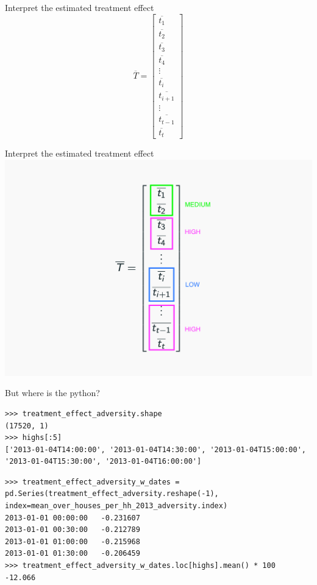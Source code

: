 \documentclass{beamer}
\begin{document}
\begin{frame}{Interpret the estimated treatment effect}
    $$
    \overline{T} = \left[\begin{array}{cccc}
    \overline{t_{1}} \\
    \overline{t_{2}} \\
    \overline{t_{3}} \\
    \overline{t_{4}} \\
    \vdots \\
    \overline{t_{i}} \\
    \overline{t_{i+1}} \\
    \vdots \\
    \overline{t_{t-1}} \\
    \overline{t_{t}}
    \end{array}\right]
    $$
\end{frame}

\begin{frame}{Interpret the estimated treatment effect}
  \centering
  \includegraphics[width=1\textwidth]{images/linear-treatment-hours.png}
\end{frame}

\begin{frame}{But where is the python?}
  \begin{verbatim}
>>> treatment_effect_adversity.shape
(17520, 1)
>>> highs[:5]
['2013-01-04T14:00:00', '2013-01-04T14:30:00', '2013-01-04T15:00:00', '2013-01-04T15:30:00', '2013-01-04T16:00:00']
  \end{verbatim}
  \pause

  \begin{verbatim}
>>> treatment_effect_adversity_w_dates = pd.Series(treatment_effect_adversity.reshape(-1), index=mean_over_houses_per_hh_2013_adversity.index)
2013-01-01 00:00:00   -0.231607
2013-01-01 00:30:00   -0.212789
2013-01-01 01:00:00   -0.215968
2013-01-01 01:30:00   -0.206459
>>> treatment_effect_adversity_w_dates.loc[highs].mean() * 100
-12.066
  \end{verbatim}
\end{frame}
\end{document}
